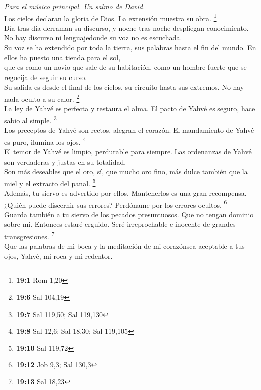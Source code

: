 \emph{Para el músico principal. Un salmo de David.}\\
 Los cielos declaran la gloria de Dios. La extensión
muestra su obra. \footnote{\textbf{19:1} Rom 1,20}\\
 Día tras día derraman su discurso, y noche tras noche
despliegan conocimiento.\\
 No hay discurso ni lenguajedonde su voz no es
escuchada.\\
 Su voz se ha extendido por toda la tierra, sus palabras
hasta el fin del mundo. En ellos ha puesto una tienda para el sol,\\
 que es como un novio que sale de su habitación, como un
hombre fuerte que se regocija de seguir su curso.\\
 Su salida es desde el final de los cielos, su circuito
hasta sus extremos. No hay nada oculto a su calor. \footnote{\textbf{19:6}
  Sal 104,19}\\
 La ley de Yahvé es perfecta y restaura el alma. El pacto
de Yahvé es seguro, hace sabio al simple. \footnote{\textbf{19:7} Sal
  119,50; Sal 119,130}\\
 Los preceptos de Yahvé son rectos, alegran el corazón. El
mandamiento de Yahvé es puro, ilumina los ojos. \footnote{\textbf{19:8}
  Sal 12,6; Sal 18,30; Sal 119,105}\\
 El temor de Yahvé es limpio, perdurable para siempre. Las
ordenanzas de Yahvé son verdaderas y justas en su totalidad.\\
 Son más deseables que el oro, sí, que mucho oro fino,
más dulce también que la miel y el extracto del panal. \footnote{\textbf{19:10}
  Sal 119,72}\\
 Además, tu siervo es advertido por ellos. Mantenerlos es
una gran recompensa.\\
 ¿Quién puede discernir sus errores? Perdóname por los
errores ocultos. \footnote{\textbf{19:12} Job 9,3; Sal 130,3}\\
 Guarda también a tu siervo de los pecados presuntuosos.
Que no tengan dominio sobre mí. Entonces estaré erguido. Seré
irreprochable e inocente de grandes transgresiones. \footnote{\textbf{19:13}
  Sal 18,23}\\
 Que las palabras de mi boca y la meditación de mi
corazónsea aceptable a tus ojos, Yahvé, mi roca y mi redentor.

